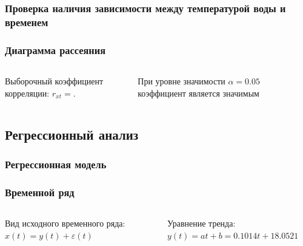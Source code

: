 \documentclass[10pt, ucs, pdf,aspectratio=169]{beamer}
\newcommand{\inp}[1]{}
\newcommand{\characteristic}[2]{\inp{#1/characteristics/#2}}
\begin{document}
\subsubsection{Проверка наличия зависимости между температурой воды и временем}
\begin{frame}
  \frametitle{Диаграмма рассеяния}   %
  \begin{columns}[c]
  \column{2in}  %
  Выборочный коэффициент корреляции: $ r_{xt} = \characteristic{original}{correlation} $.

  При уровне значимости $ \alpha=0.05 $ коэффициент является значимым
  \column{3in}
  \end{columns}
\end{frame}

\subsection{Регрессионный анализ}

\subsubsection{Регрессионная модель}
\begin{frame}
  \frametitle{Временной ряд}   %
  \begin{columns}[c]
  \column{2in}  %
  Вид исходного временного ряда: $x(t) = y(t) + \varepsilon(t)$

  Уравнение тренда: $ y(t) = at + b = 0.1014t + 18.0521 $
  \column{3in}
  \end{columns}
\end{frame}
\end{document}
